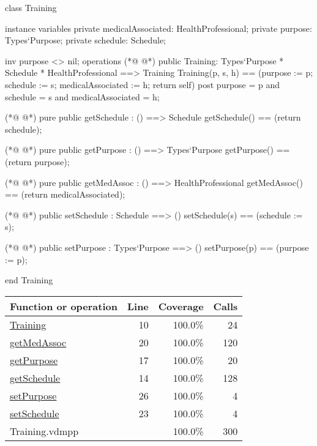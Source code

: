 \begin{vdmpp}[breaklines=true]
class Training
 
instance variables
 private medicalAssociated: HealthProfessional;
 private purpose: Types`Purpose;
 private schedule: Schedule;

 inv purpose <> nil;
operations
(*@
\label{Training:10}
@*)
 public Training: Types`Purpose * Schedule * HealthProfessional ==> Training
   Training(p, s, h) == (purpose := p; schedule := s; medicalAssociated := h; return self)
 post purpose = p and schedule = s and medicalAssociated = h;

(*@
\label{getSchedule:14}
@*)
 pure public getSchedule : () ==> Schedule
   getSchedule() == (return schedule);
 
(*@
\label{getPurpose:17}
@*)
  pure public getPurpose : () ==> Types`Purpose
  getPurpose() == (return purpose); 
 
(*@
\label{getMedAssoc:20}
@*)
 pure public getMedAssoc : () ==> HealthProfessional
  getMedAssoc() == (return medicalAssociated); 

(*@
\label{setSchedule:23}
@*)
 public setSchedule : Schedule ==> ()
   setSchedule(s) == (schedule := s);
 
(*@
\label{setPurpose:26}
@*)
 public setPurpose : Types`Purpose ==> ()
   setPurpose(p) == (purpose := p);
 
 end Training
\end{vdmpp}
\bigskip
\begin{longtable}{|l|r|r|r|}
\hline
Function or operation & Line & Coverage & Calls \\
\hline
\hline
\hyperref[Training:10]{Training} & 10&100.0\% & 24 \\
\hline
\hyperref[getMedAssoc:20]{getMedAssoc} & 20&100.0\% & 120 \\
\hline
\hyperref[getPurpose:17]{getPurpose} & 17&100.0\% & 20 \\
\hline
\hyperref[getSchedule:14]{getSchedule} & 14&100.0\% & 128 \\
\hline
\hyperref[setPurpose:26]{setPurpose} & 26&100.0\% & 4 \\
\hline
\hyperref[setSchedule:23]{setSchedule} & 23&100.0\% & 4 \\
\hline
\hline
Training.vdmpp & & 100.0\% & 300 \\
\hline
\end{longtable}

